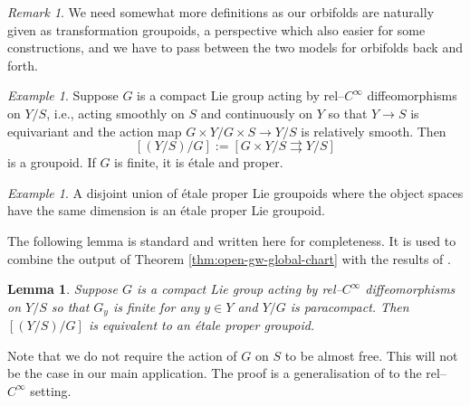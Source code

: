 \documentclass[11pt,psamsfonts, oneside, reqno]{amsart}
\newtheorem{lemma}[theorem]{Lemma}
\theoremstyle{definition}
\theoremstyle{remark}
\newtheorem{remark}[theorem]{Remark}
\newtheorem{example}[theorem]{Example}
\numberwithin{equation}{section}
\begin{document}
\begin{remark}\label{} We need somewhat more definitions as our orbifolds are naturally given as transformation groupoids, a perspective which also easier for some constructions, and we have to pass between the two models for orbifolds back and forth.\end{remark}

\begin{example}\label{ex:finite-group-groupoid} Suppose $G$ is a compact Lie group acting by rel--$C^\infty$ diffeomorphisms on $Y/S$, i.e., acting smoothly on $S$ and continuously on $Y$ so that $Y\to S$ is equivariant and the action map $G\times Y/G\times S\to Y/S$ is relatively smooth. Then 
	$$[(Y/S)/G] := [G\times Y/S\rightrightarrows Y/S]$$
	is a groupoid. If $G$ is finite, it is \'etale and proper.
\end{example}

\begin{example}\label{ex:disjoint-union-groupoids} A disjoint union of étale proper Lie groupoids where the object spaces have the same dimension is an étale proper Lie groupoid.\end{example}

\noindent
The following lemma is standard and written here for completeness. It is used to combine the output of Theorem \ref{thm:open-gw-global-chart} with the results of \cite{ST16}.


\begin{lemma}\label{lem:equivalent-to-ep-groupoid} Suppose $G$ is a compact Lie group acting by rel--$C^\infty$ diffeomorphisms on $Y/S$ so that $G_y$ is finite for any $y \in Y$ and $Y/G$ is paracompact. Then $[(Y/S)/G]$ is equivalent to an \'etale proper groupoid.
\end{lemma}

\noindent
Note that we do not require the action of $G$ on $S$ to be almost free. This will not be the case in our main application. The proof is a generalisation of \cite[Example~2.6]{RS06} to the rel--$C^\infty$ setting.
\end{document}
